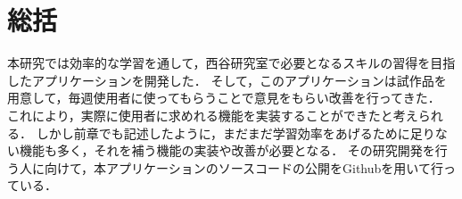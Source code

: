 \chapter{総括}\label{ux7dcfux62ec}

本研究では効率的な学習を通して，西谷研究室で必要となるスキルの習得を目指したアプリケーションを開発した．
そして，このアプリケーションは試作品を用意して，毎週使用者に使ってもらうことで意見をもらい改善を行ってきた．
これにより，実際に使用者に求めれる機能を実装することができたと考えられる．
しかし前章でも記述したように，まだまだ学習効率をあげるために足りない機能も多く，それを補う機能の実装や改善が必要となる．
その研究開発を行う人に向けて，本アプリケーションのソースコードの公開をGithubを用いて行っている．
